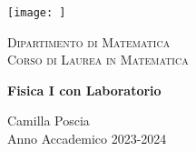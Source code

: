 \documentclass[italian,11pt,a4paper]{report}
\begin{document}
	
	\begin{titlepage}
		\centering
		\texttt{[image: ]} 
		
		\vspace{1cm}
		
		\textsc{\Large Dipartimento di Matematica} \\
		\vspace{0.5cm}
		\textsc{\large Corso di Laurea in Matematica} \\
		
		\vspace{3cm}
		
		\LARGE \textbf{Fisica I con Laboratorio} \\
		
		\vspace{6cm}
		
		\large Camilla Poscia \\
		
		\vspace{0.2cm}
		Anno Accademico 2023-2024 \\
		
		\vspace{1cm}
	\end{titlepage}
	
\end{document}
